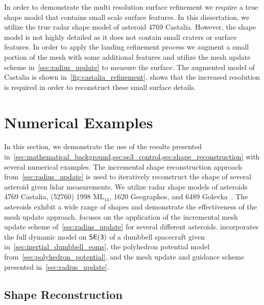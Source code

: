 In order to demonstrate the multi resolution surface refinement we require a true shape model that contains small scale surface features.
In this dissertation, we utilize the true radar shape model of asteroid 4769 Castalia.
However, the shape model is not highly detailed as it does not contain small craters or surface features.
In order to apply the landing refinement process we augment a small portion of the mesh with some additional features and utilize the mesh update scheme in~\cref{sec:radius_update} to measure the surface.
The augmented model of Castalia is shown in~\cref{fig:castalia_refinement}.
 shows that the increased resolution is required in order to reconstruct these small surface details.


\section{Numerical Examples}\label{sec:reconstruction_examples}

In this section, we demonstrate the use of the results presented in~\cref{sec:mathematical_background,sec:se3_control,sec:shape_reconstruction} with several numerical examples.
The incremental shape reconstruction approach from~\cref{sec:radius_update} is used to iteratively reconstruct the shape of several asteroid given \gls{lidar} measurements.
We utilize radar shape models of asteroids \num{4769} Castalia, (\num{52760}) \num{1998} \(\text{ML}_{14}\), \num{1620} Geographos, and 6489 Golevka~\cite{neese2004}.
The asteroids exhibit a wide range of shapes and demonstrate the effectiveness of the mesh update approach.
 focuses on the application of the incremental mesh update scheme of~\cref{sec:radius_update} for several different asteroids.
 incorporates the full dynamic model on \( \mathsf{SE(3)} \) of a dumbbell spacecraft given in~\cref{sec:inertial_dumbbell_eoms}, the polyhedron potential model from~\cref{sec:polyhedron_potential}, and the mesh update and guidance scheme presented in~\cref{sec:radius_update}.

\subsection{Shape Reconstruction}\label{sec:kinematic_exploration}

